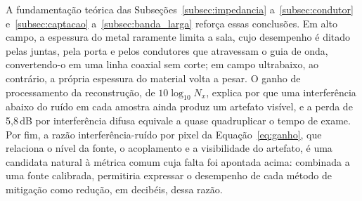 \documentclass[portuguese]{sbcreviews-2025}%
\begin{document}
A fundamentação teórica das Subseções~\ref{subsec:impedancia} a~\ref{subsec:condutor} e~\ref{subsec:captacao} a~\ref{subsec:banda_larga} reforça essas conclusões. Em alto campo, a espessura do metal raramente limita a sala, cujo desempenho é ditado pelas juntas, pela porta e pelos condutores que atravessam o guia de onda, convertendo-o em uma linha coaxial sem corte; em campo ultrabaixo, ao contrário, a própria espessura do material volta a pesar. O ganho de processamento da reconstrução, de $10\log_{10}N_x$, explica por que uma interferência abaixo do ruído em cada amostra ainda produz um artefato visível, e a perda de 5,8\,dB por interferência difusa equivale a quase quadruplicar o tempo de exame. Por fim, a razão interferência-ruído por pixel da Equação~\eqref{eq:ganho}, que relaciona o nível da fonte, o acoplamento e a visibilidade do artefato, é uma candidata natural à métrica comum cuja falta foi apontada acima: combinada a uma fonte calibrada, permitiria expressar o desempenho de cada método de mitigação como redução, em decibéis, dessa razão.



\end{document}
